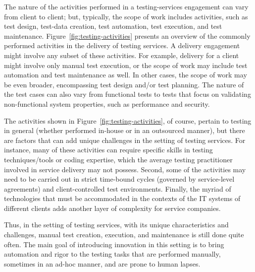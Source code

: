 The nature of the activities performed in a testing-services engagement can vary
from client to client; but, typically, the scope of work includes activities,
such as test design, test-data creation, test automation, test execution, and
test maintenance. Figure~\ref{fig:testing-activities} presents an overview of
the commonly performed activities in the delivery of testing services. A
delivery engagement might involve any subset of these activities. For example,
delivery for a client might involve only manual test execution, or the scope of
work may include test automation and test maintenance as well. In other cases,
the scope of work may be even broader, encompassing test design and/or test
planning. The nature of the test cases can also vary from functional tests to
tests that focus on validating non-functional system properties, such as
performance and security.

The activities shown in Figure~\ref{fig:testing-activities}, of course, pertain
to testing in general (whether performed in-house or in an outsourced manner),
but there are factors that can add unique challenges in the setting of testing
services. For instance, many of these activities can require specific skills in
testing techniques/tools or coding expertise, which the average testing
practitioner involved in service delivery may not possess. Second, some of the
activities may need to be carried out in strict time-bound cycles (governed by
service-level agreements) and client-controlled test environments. Finally, the
myriad of technologies that must be accommodated in the contexts of the IT
systems of different clients adds another layer of complexity for service
companies.

Thus, in the setting of testing services, with its unique characteristics and
challenges, manual test creation, execution, and maintenance is still done quite
often.  The main goal of introducing innovation in this setting is to bring
automation and rigor to the testing tasks that are performed manually, sometimes
in an ad-hoc manner, and are prone to human lapses.

